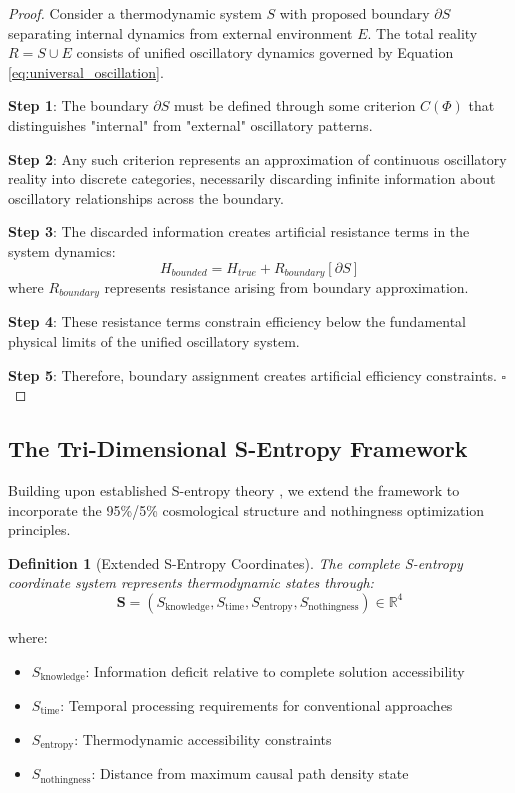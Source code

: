 \documentclass[11pt,a4paper]{article}
\newtheorem{definition}[theorem]{Definition}
\theoremstyle{remark}
\begin{document}
\begin{proof}
Consider a thermodynamic system $S$ with proposed boundary $\partial S$ separating internal dynamics from external environment $E$. The total reality $R = S \cup E$ consists of unified oscillatory dynamics governed by Equation \ref{eq:universal_oscillation}.

\textbf{Step 1}: The boundary $\partial S$ must be defined through some criterion $C(\Phi)$ that distinguishes "internal" from "external" oscillatory patterns.

\textbf{Step 2}: Any such criterion represents an approximation of continuous oscillatory reality into discrete categories, necessarily discarding infinite information about oscillatory relationships across the boundary.

\textbf{Step 3}: The discarded information creates artificial resistance terms in the system dynamics:
\begin{equation}
H_{bounded} = H_{true} + R_{boundary}[\partial S]
\end{equation}
where $R_{boundary}$ represents resistance arising from boundary approximation.

\textbf{Step 4}: These resistance terms constrain efficiency below the fundamental physical limits of the unified oscillatory system.

\textbf{Step 5}: Therefore, boundary assignment creates artificial efficiency constraints. $\square$
\end{proof}

\subsection{The Tri-Dimensional S-Entropy Framework}

Building upon established S-entropy theory \cite{sachikonye2024sentropy}, we extend the framework to incorporate the 95\%/5\% cosmological structure and nothingness optimization principles.

\begin{definition}[Extended S-Entropy Coordinates]
The complete S-entropy coordinate system represents thermodynamic states through:
\begin{equation}
\mathbf{S} = (S_{\text{knowledge}}, S_{\text{time}}, S_{\text{entropy}}, S_{\text{nothingness}}) \in \mathbb{R}^4
\label{eq:extended_s_coords}
\end{equation}
\end{definition}

where:
\begin{itemize}
\item $S_{\text{knowledge}}$: Information deficit relative to complete solution accessibility
\item $S_{\text{time}}$: Temporal processing requirements for conventional approaches  
\item $S_{\text{entropy}}$: Thermodynamic accessibility constraints
\item $S_{\text{nothingness}}$: Distance from maximum causal path density state
\end{itemize}
\end{document}
